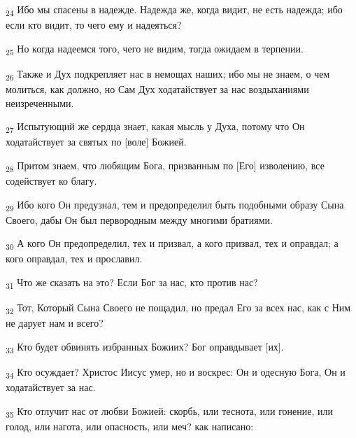 \begin{tcolorbox}
\textsubscript{24} Ибо мы спасены в надежде. Надежда же, когда видит, не есть надежда; ибо если кто видит, то чего ему и надеяться?
\end{tcolorbox}
\begin{tcolorbox}
\textsubscript{25} Но когда надеемся того, чего не видим, тогда ожидаем в терпении.
\end{tcolorbox}
\begin{tcolorbox}
\textsubscript{26} Также и Дух подкрепляет нас в немощах наших; ибо мы не знаем, о чем молиться, как должно, но Сам Дух ходатайствует за нас воздыханиями неизреченными.
\end{tcolorbox}
\begin{tcolorbox}
\textsubscript{27} Испытующий же сердца знает, какая мысль у Духа, потому что Он ходатайствует за святых по [воле] Божией.
\end{tcolorbox}
\begin{tcolorbox}
\textsubscript{28} Притом знаем, что любящим Бога, призванным по [Его] изволению, все содействует ко благу.
\end{tcolorbox}
\begin{tcolorbox}
\textsubscript{29} Ибо кого Он предузнал, тем и предопределил быть подобными образу Сына Своего, дабы Он был первородным между многими братиями.
\end{tcolorbox}
\begin{tcolorbox}
\textsubscript{30} А кого Он предопределил, тех и призвал, а кого призвал, тех и оправдал; а кого оправдал, тех и прославил.
\end{tcolorbox}
\begin{tcolorbox}
\textsubscript{31} Что же сказать на это? Если Бог за нас, кто против нас?
\end{tcolorbox}
\begin{tcolorbox}
\textsubscript{32} Тот, Который Сына Своего не пощадил, но предал Его за всех нас, как с Ним не дарует нам и всего?
\end{tcolorbox}
\begin{tcolorbox}
\textsubscript{33} Кто будет обвинять избранных Божиих? Бог оправдывает [их].
\end{tcolorbox}
\begin{tcolorbox}
\textsubscript{34} Кто осуждает? Христос Иисус умер, но и воскрес: Он и одесную Бога, Он и ходатайствует за нас.
\end{tcolorbox}
\begin{tcolorbox}
\textsubscript{35} Кто отлучит нас от любви Божией: скорбь, или теснота, или гонение, или голод, или нагота, или опасность, или меч? как написано:
\end{tcolorbox}
